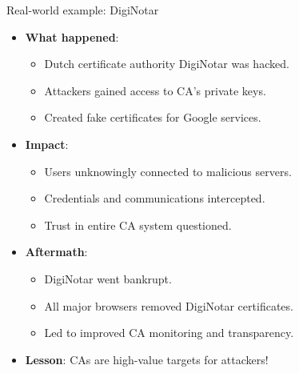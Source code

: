 \documentclass[aspectratio=169, lualatex, handout]{beamer}
\begin{document}
\begin{frame}{Real-world example: DigiNotar}
	\begin{itemize}
		\item \textbf{What happened}:
		      \begin{itemize}
			      \item Dutch certificate authority DigiNotar was hacked.
			      \item Attackers gained access to CA's private keys.
			      \item Created fake certificates for Google services.
		      \end{itemize}
		\item \textbf{Impact}:
		      \begin{itemize}
			      \item Users unknowingly connected to malicious servers.
			      \item Credentials and communications intercepted.
			      \item Trust in entire CA system questioned.
		      \end{itemize}
		\item \textbf{Aftermath}:
		      \begin{itemize}
			      \item DigiNotar went bankrupt.
			      \item All major browsers removed DigiNotar certificates.
			      \item Led to improved CA monitoring and transparency.
		      \end{itemize}
		\item \textbf{Lesson}: CAs are high-value targets for attackers!
	\end{itemize}
\end{frame}
\end{document}
